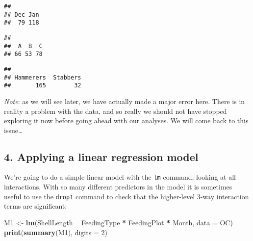 \documentclass[]{article}
\newenvironment{Shaded}{\begin{snugshade}}{\end{snugshade}}
\newcommand{\KeywordTok}[1]{\textcolor[rgb]{0.13,0.29,0.53}{\textbf{#1}}}
\newcommand{\DataTypeTok}[1]{\textcolor[rgb]{0.13,0.29,0.53}{#1}}
\newcommand{\DecValTok}[1]{\textcolor[rgb]{0.00,0.00,0.81}{#1}}
\newcommand{\StringTok}[1]{\textcolor[rgb]{0.31,0.60,0.02}{#1}}
\newcommand{\OperatorTok}[1]{\textcolor[rgb]{0.81,0.36,0.00}{\textbf{#1}}}
\newcommand{\NormalTok}[1]{#1}
\begin{document}
\begin{verbatim}
## 
## Dec Jan 
##  79 118
\end{verbatim}

\begin{Shaded}
\end{Shaded}

\begin{verbatim}
## 
##  A  B  C 
## 66 53 78
\end{verbatim}

\begin{Shaded}
\end{Shaded}

\begin{verbatim}
## 
## Hammerers  Stabbers 
##       165        32
\end{verbatim}

\emph{Note}: as we will see later, we have actually made a major error
here. There is in reality a problem with the data, and so really we
should not have stopped exploring it now before going ahead with our
analyses. We will come back to this issue\ldots{}

\subsection{4. Applying a linear regression
model}\label{applying-a-linear-regression-model}

We're going to do a simple linear model with the \texttt{lm} command,
looking at all interactions. With so many different predictors in the
model it is sometimes useful to use the \texttt{drop1} command to check
that the higher-level 3-way interaction terms are significant:

\begin{Shaded}
\begin{Highlighting}[]
\NormalTok{M1 <-}\StringTok{ }\KeywordTok{lm}\NormalTok{(ShellLength }\OperatorTok{~}\StringTok{ }\NormalTok{FeedingType }\OperatorTok{*}\StringTok{ }\NormalTok{FeedingPlot }\OperatorTok{*}\StringTok{ }\NormalTok{Month,}
         \DataTypeTok{data =}\NormalTok{ OC)}
\KeywordTok{print}\NormalTok{(}\KeywordTok{summary}\NormalTok{(M1), }\DataTypeTok{digits =} \DecValTok{2}\NormalTok{)}
\end{Highlighting}
\end{Shaded}
\end{document}
